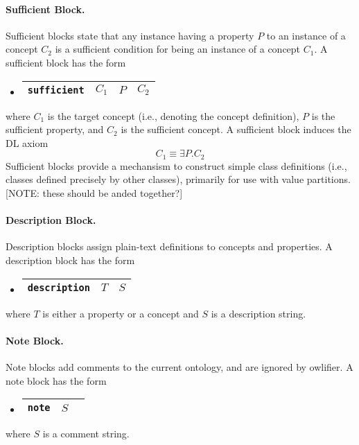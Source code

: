 \documentclass[11pt,onecolumn]{article}
\newcommand{\owlifier}{\textsf{owlifier}}
\begin{document}
\paragraph{Sufficient Block.} Sufficient blocks state that any
instance having a property $P$ to an instance of a concept $C_2$ is a
sufficient condition for being an instance of a concept $C_1$. A
sufficient block has the form
\begin{itemize}
\item[]
  \begin{tabular}{|l|l|l|l|}\hline \texttt{sufficient} & $C_1$ & $P$ & $C_2$
    \\ \hline
  \end{tabular}
\end{itemize}
where $C_1$ is the target concept (i.e., denoting the concept
definition), $P$ is the sufficient property, and $C_2$ is the
sufficient concept. A sufficient block induces the DL axiom \[C_1
\equiv \exists P.C_2\] Sufficient blocks provide a mechansism to
construct simple class definitions (i.e., classes defined precisely by
other classes), primarily for use with value partitions. [NOTE: these
should be anded together?]

\paragraph{Description Block.} Description blocks assign plain-text
definitions to concepts and properties. A description block has the
form
\begin{itemize}
\item[]
  \begin{tabular}{|l|l|l|}\hline \texttt{description} & $T$ & $S$
\\ \hline
  \end{tabular}
\end{itemize}
where $T$ is either a property or a concept and $S$ is a description
string.

\paragraph{Note Block.} Note blocks add comments to the current
ontology, and are ignored by \owlifier.  A note block has the form
\begin{itemize}
\item[]
  \begin{tabular}{|l|l|l|}\hline \texttt{note} & $S$
\\ \hline
  \end{tabular}
\end{itemize}
where $S$ is a comment string.
\end{document}
